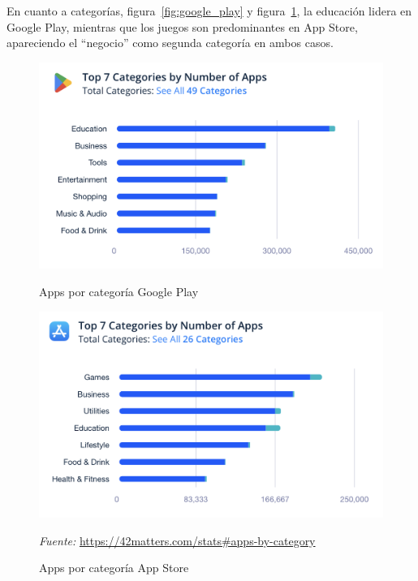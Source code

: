 En cuanto a categorías, figura~\ref{fig:google_play} y figura~\ref{fig:app_store}, la educación lidera en Google Play, mientras que los juegos son predominantes en App Store, apareciendo el “negocio” como segunda categoría en ambos casos.

\begin{figure}[H]
\centering
\begin{minipage}[t]{0.48\textwidth}
\centering
\includegraphics[width=\linewidth]{img/intro/google_play_categories.png}
\caption{Apps por categoría Google Play}
\label{fig:google_play}
\end{minipage}
\hfill
\begin{minipage}[t]{0.48\textwidth}
\centering
\includegraphics[width=\linewidth]{img/intro/app_store_categories.png}
\caption{Apps por categoría App Store}
\label{fig:app_store}
\end{minipage}
\vspace{0.5em}
\vspace{0.5em}
{\footnotesize \centering \textit{Fuente:} \url{https://42matters.com/stats#apps-by-category} \par}
\end{figure}

